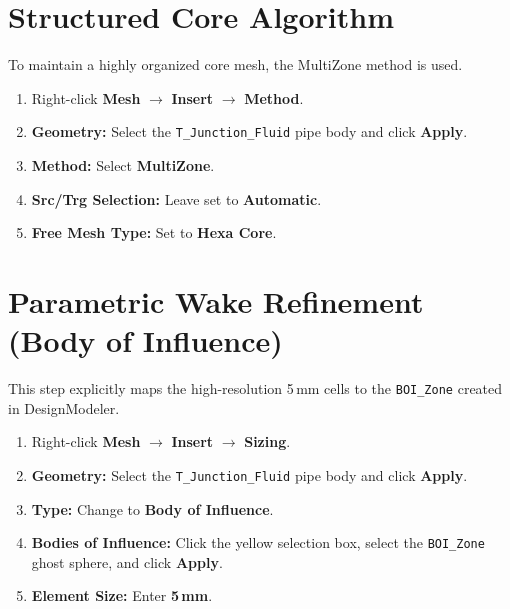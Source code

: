 \documentclass[12pt,a4paper]{report}
\begin{document}
\section{Structured Core Algorithm}

To maintain a highly organized core mesh, the MultiZone method is used.

\begin{enumerate}
  \item Right-click \textbf{Mesh} $\rightarrow$ \textbf{Insert} $\rightarrow$ \textbf{Method}.
  \item \textbf{Geometry:} Select the \texttt{T\_Junction\_Fluid} pipe body and click \textbf{Apply}.
  \item \textbf{Method:} Select \textbf{MultiZone}.
  \item \textbf{Src/Trg Selection:} Leave set to \textbf{Automatic}.
  \item \textbf{Free Mesh Type:} Set to \textbf{Hexa Core}.
\end{enumerate}

\medskip
\noindent{}


\section{Parametric Wake Refinement (Body of Influence)}

This step explicitly maps the high-resolution 5\,mm cells to the \texttt{BOI\_Zone} created in DesignModeler.

\begin{enumerate}
  \item Right-click \textbf{Mesh} $\rightarrow$ \textbf{Insert} $\rightarrow$ \textbf{Sizing}.
  \item \textbf{Geometry:} Select the \texttt{T\_Junction\_Fluid} pipe body and click \textbf{Apply}.
  \item \textbf{Type:} Change to \textbf{Body of Influence}.
  \item \textbf{Bodies of Influence:} Click the yellow selection box, select the \texttt{BOI\_Zone} ghost sphere, and click \textbf{Apply}.
  \item \textbf{Element Size:} Enter \textbf{5\,mm}.
\end{enumerate}
\end{document}
